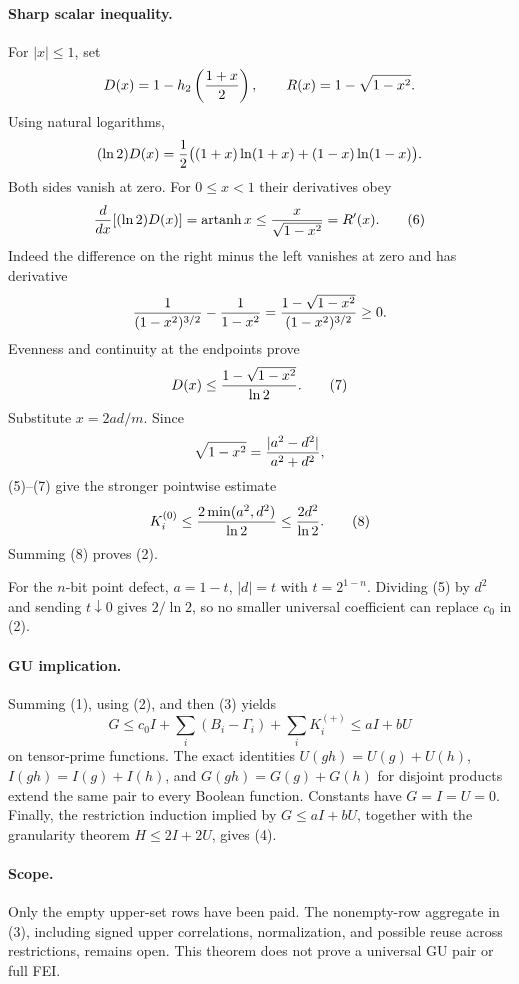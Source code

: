 \paragraph{Sharp scalar inequality.}
For $|x|\le1$, set
\[
 D(x)=1-h_2\left({1+x\over2}\right),\qquad
 R(x)=1-\sqrt{1-x^2}.
\]
Using natural logarithms,
\[
 (\ln2)D(x)={1\over2}\big((1+x)\ln(1+x)+(1-x)\ln(1-x)\big).
\]
Both sides vanish at zero.  For $0\le x<1$ their derivatives obey
\[
 {d\over dx}[(\ln2)D(x)]=\operatorname{artanh}x
 \le {x\over\sqrt{1-x^2}}=R'(x).                     \tag{6}
\]
Indeed the difference on the right minus the left vanishes at zero and
has derivative
\[
 {1\over(1-x^2)^{3/2}}-{1\over1-x^2}
 ={1-\sqrt{1-x^2}\over(1-x^2)^{3/2}}\ge0.
\]
Evenness and continuity at the endpoints prove
\[
 D(x)\le {1-\sqrt{1-x^2}\over\ln2}.                  \tag{7}
\]
Substitute $x=2ad/m$.  Since
\[
 \sqrt{1-x^2}={|a^2-d^2|\over a^2+d^2},
\]
(5)--(7) give the stronger pointwise estimate
\[
 K_i^{(0)}\le {2\min(a^2,d^2)\over\ln2}
 \le {2d^2\over\ln2}.                                \tag{8}
\]
Summing (8) proves (2).

For the $n$-bit point defect, $a=1-t$, $|d|=t$ with
$t=2^{1-n}$.  Dividing (5) by $d^2$ and sending $t\downarrow0$ gives
$2/\ln2$, so no smaller universal coefficient can replace $c_0$ in
(2).

\paragraph{GU implication.}
Summing (1), using (2), and then (3) yields
\[
 G\le c_0I+\sum_i(B_i-\Gamma_i)+\sum_iK_i^{(+)}
 \le aI+bU
\]
on tensor-prime functions.  The exact identities
$U(gh)=U(g)+U(h)$, $I(gh)=I(g)+I(h)$, and
$G(gh)=G(g)+G(h)$ for disjoint products extend the same pair to every
Boolean function.  Constants have $G=I=U=0$.  Finally, the restriction
induction implied by $G\le aI+bU$, together with the granularity theorem
$H\le2I+2U$, gives (4).

\paragraph{Scope.}
Only the empty upper-set rows have been paid.  The nonempty-row aggregate
in (3), including signed upper correlations, normalization, and possible
reuse across restrictions, remains open.  This theorem does not prove a
universal GU pair or full FEI.

